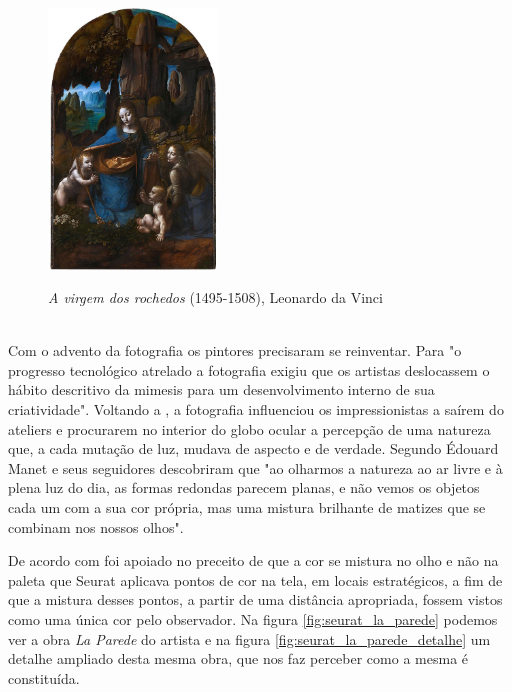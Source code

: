 \begin{figure}[H]
    \centering
    \caption{\textit{A virgem dos rochedos} (1495-1508), Leonardo da Vinci}
	\vspace*{0,2cm}
    \includegraphics[width=0.4\textwidth]{./04-figuras/da_vinci_virgem_rochedos}
    \label{fig:da_vinci_virgem_rochedos}
\end{figure}
\vspace*{-0,9cm}
{\raggedright {}}\\


Com o advento da fotografia os pintores precisaram se reinventar. Para  "o progresso tecnológico atrelado a fotografia exigiu que os artistas deslocassem o hábito descritivo da mimesis para um desenvolvimento interno de sua criatividade". Voltando a , a fotografia influenciou os impressionistas a saírem do ateliers e procurarem no interior do globo ocular a percepção de uma natureza que, a cada mutação de luz, mudava de aspecto e de verdade. Segundo  Édouard Manet e seus seguidores descobriram que "ao olharmos a natureza ao ar livre e à plena luz do dia, as formas redondas parecem planas, e não vemos os objetos cada um com a sua cor própria, mas uma mistura brilhante de matizes que se combinam nos nossos olhos".


De acordo com  foi apoiado no preceito de que a cor se mistura no olho e não na paleta que Seurat aplicava pontos de cor na tela, em locais estratégicos, a fim de que a mistura desses pontos, a partir de uma distância apropriada, fossem vistos como uma única cor pelo observador. Na figura \ref{fig:seurat_la_parede} podemos ver a obra  \textit{La Parede} do artista e na figura \ref{fig:seurat_la_parede_detalhe} um detalhe ampliado desta mesma obra, que nos faz perceber como a mesma é constituída.

